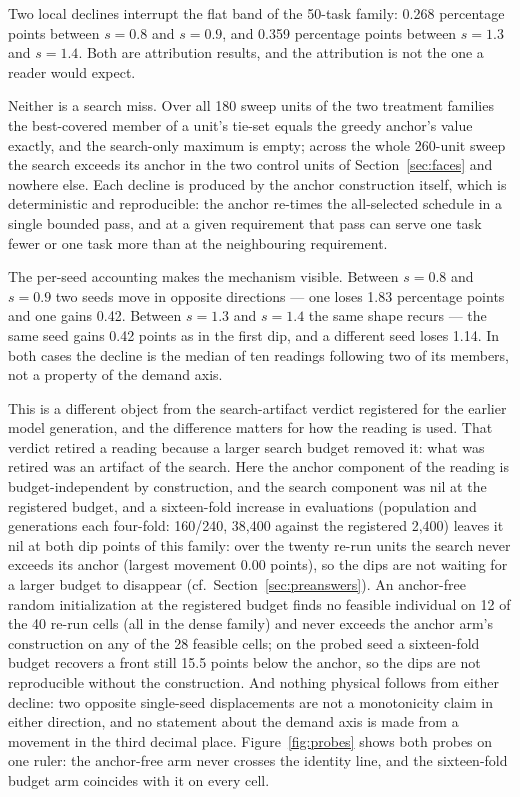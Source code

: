 \documentclass[preprint,authoryear]{elsarticle}
\begin{document}
Two local declines interrupt the flat band of the 50-task family: 0.268 percentage points between $s=0.8$ and $s=0.9$, and 0.359 percentage points between $s=1.3$ and $s=1.4$. Both are attribution results, and the attribution is not the one a reader would expect.

Neither is a search miss. Over all 180 sweep units of the two treatment families the best-covered member of a unit's tie-set equals the greedy anchor's value exactly, and the search-only maximum is empty; across the whole 260-unit sweep the search exceeds its anchor in the two control units of Section~\ref{sec:faces} and nowhere else. Each decline is produced by the anchor construction itself, which is deterministic and reproducible: the anchor re-times the all-selected schedule in a single bounded pass, and at a given requirement that pass can serve one task fewer or one task more than at the neighbouring requirement.

The per-seed accounting makes the mechanism visible. Between $s=0.8$ and $s=0.9$ two seeds move in opposite directions --- one loses 1.83 percentage points and one gains 0.42. Between $s=1.3$ and $s=1.4$ the same shape recurs --- the same seed gains 0.42 points as in the first dip, and a different seed loses 1.14. In both cases the decline is the median of ten readings following two of its members, not a property of the demand axis.

This is a different object from the search-artifact verdict registered for the earlier model generation, and the difference matters for how the reading is used. That verdict retired a reading because a larger search budget removed it: what was retired was an artifact of the search. Here the anchor component of the reading is budget-independent by construction, and the search component was nil at the registered budget, and a sixteen-fold increase in evaluations (population and generations each four-fold: 160/240, 38{,}400 against the registered 2{,}400) leaves it nil at both dip points of this family: over the twenty re-run units the search never exceeds its anchor (largest movement 0.00 points), so the dips are not waiting for a larger budget to disappear (cf.\ Section~\ref{sec:preanswers}). An anchor-free random initialization at the registered budget finds no feasible individual on 12 of the 40 re-run cells (all in the dense family) and never exceeds the anchor arm's construction on any of the 28 feasible cells; on the probed seed a sixteen-fold budget recovers a front still 15.5 points below the anchor, so the dips are not reproducible without the construction. And nothing physical follows from either decline: two opposite single-seed displacements are not a monotonicity claim in either direction, and no statement about the demand axis is made from a movement in the third decimal place. Figure~\ref{fig:probes} shows both probes on one ruler: the anchor-free arm never crosses the identity line, and the sixteen-fold budget arm coincides with it on every cell.
\end{document}
